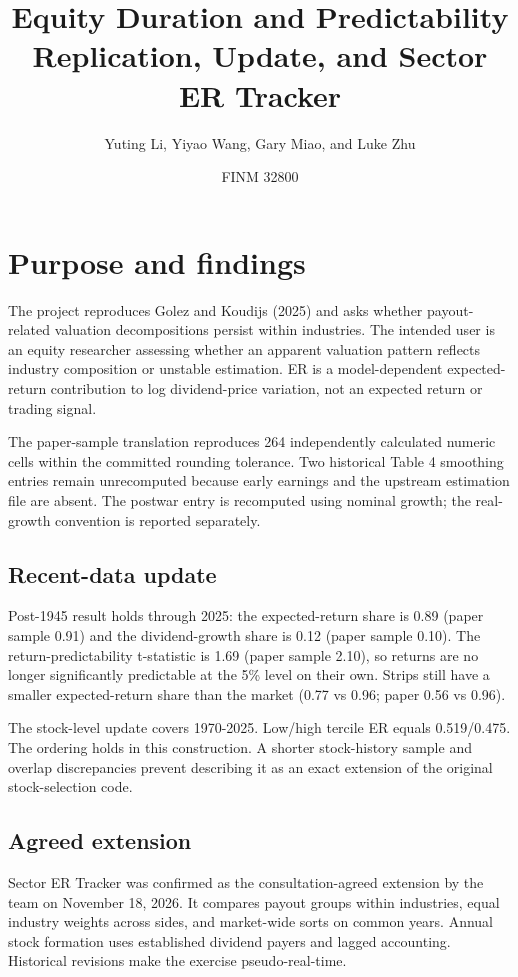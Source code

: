 \documentclass[10pt]{article}
\title{Equity Duration and Predictability\\Replication, Update, and Sector ER Tracker}
\author{Yuting Li, Yiyao Wang, Gary Miao, and Luke Zhu}
\date{FINM 32800}
\begin{document}
\maketitle
\section{Purpose and findings}
The project reproduces Golez and Koudijs (2025) and asks whether payout-related valuation decompositions persist within industries. The intended user is an equity researcher assessing whether an apparent valuation pattern reflects industry composition or unstable estimation. ER is a model-dependent expected-return contribution to log dividend-price variation, not an expected return or trading signal.

The paper-sample translation reproduces 264 independently calculated numeric cells within the committed rounding tolerance. Two historical Table 4 smoothing entries remain unrecomputed because early earnings and the upstream estimation file are absent. The postwar entry is recomputed using nominal growth; the real-growth convention is reported separately.

\subsection{Recent-data update}
Post-1945 result holds through 2025: the expected-return share is 0.89 (paper sample 0.91) and the dividend-growth share is 0.12 (paper sample 0.10). The return-predictability t-statistic is 1.69 (paper sample 2.10), so returns are no longer significantly predictable at the 5\% level on their own. Strips still have a smaller expected-return share than the market (0.77 vs 0.96; paper 0.56 vs 0.96).

The stock-level update covers 1970-2025. Low/high tercile ER equals 0.519/0.475. The ordering holds in this construction. A shorter stock-history sample and overlap discrepancies prevent describing it as an exact extension of the original stock-selection code.

\subsection{Agreed extension}
Sector ER Tracker was confirmed as the consultation-agreed extension by the team on November 18, 2026. It compares payout groups within industries, equal industry weights across sides, and market-wide sorts on common years. Annual stock formation uses established dividend payers and lagged accounting. Historical revisions make the exercise pseudo-real-time.
\end{document}
